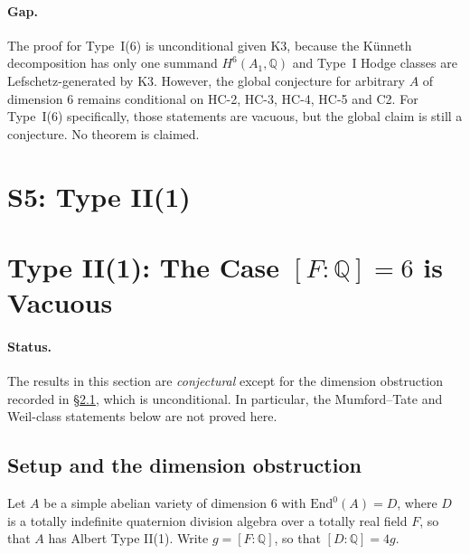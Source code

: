 \documentclass{article}
\begin{document}
\paragraph{Gap.}
The proof for Type~I(6) is unconditional given K3, because the K\"unneth decomposition has only one summand $H^6(A_1,\mathbb{Q})$ and Type~I Hodge classes are Lefschetz-generated by K3. However, the global conjecture for arbitrary $A$ of dimension $6$ remains conditional on HC-2, HC-3, HC-4, HC-5 and C2. For Type~I(6) specifically, those statements are vacuous, but the global claim is still a conjecture. No theorem is claimed.

\section{S5: Type II(1)}
\section{Type II(1): The Case $[F:\mathbb{Q}]=6$ is Vacuous}
\label{sec:type-II-1}

\paragraph{Status.}
The results in this section are \emph{conjectural} except for the dimension
obstruction recorded in \S\ref{sec:II1-dim}, which is unconditional. In
particular, the Mumford--Tate and Weil-class statements below are not proved
here.

\subsection{Setup and the dimension obstruction}
\label{sec:II1-dim}

Let $A$ be a simple abelian variety of dimension $6$ with
$\mathrm{End}^0(A) = D$, where $D$ is a totally indefinite quaternion
division algebra over a totally real field $F$, so that $A$ has Albert
Type II(1). Write $g = [F:\mathbb{Q}]$, so that $[D:\mathbb{Q}] = 4g$.
\end{document}
